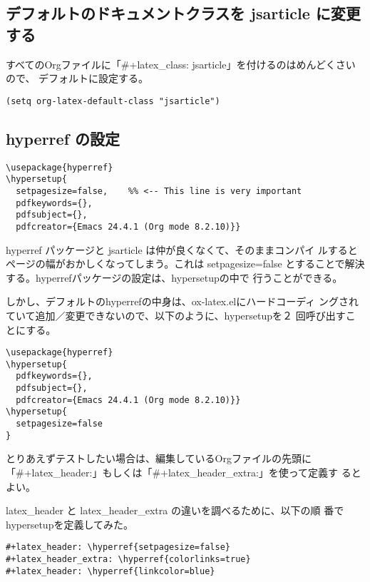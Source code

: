 \documentclass[dvipdfmx,12pt]{jsarticle}
\begin{document}
\subsection{デフォルトのドキュメントクラスを jsarticle に変更する}
\label{sec-4-6}

すべてのOrgファイルに「\#+latex\_class: jsarticle」を付けるのはめんどくさいので、
デフォルトに設定する。

\lstset{language=Lisp,label= ,caption= ,numbers=none}
\begin{lstlisting}
(setq org-latex-default-class "jsarticle")
\end{lstlisting}

\subsection{hyperref の設定}
\label{sec-4-7}

\lstset{language=[LaTeX]TeX,label= ,caption= ,numbers=none}
\begin{lstlisting}
\usepackage{hyperref}
\hypersetup{
  setpagesize=false,    %% <-- This line is very important
  pdfkeywords={},
  pdfsubject={},
  pdfcreator={Emacs 24.4.1 (Org mode 8.2.10)}}
\end{lstlisting}

hyperref パッケージと jsarticle は仲が良くなくて、そのままコンパイ
ルするとページの幅がおかしくなってしまう。これは setpagesize=false
とすることで解決する。hyperrefパッケージの設定は、hypersetupの中で
行うことができる。

しかし、デフォルトのhyperrefの中身は、ox-latex.elにハードコーディ
ングされていて追加／変更できないので、以下のように、hypersetupを２
回呼び出すことにする。

\lstset{language=[LaTeX]TeX,label= ,caption= ,numbers=none}
\begin{lstlisting}
\usepackage{hyperref}
\hypersetup{
  pdfkeywords={},
  pdfsubject={},
  pdfcreator={Emacs 24.4.1 (Org mode 8.2.10)}}
\hypersetup{
  setpagesize=false
}
\end{lstlisting}

とりあえずテストしたい場合は、編集しているOrgファイルの先頭に
「\#+latex\_header:」もしくは「\#+latex\_header\_extra:」を使って定義す
るとよい。

latex\_header と latex\_header\_extra の違いを調べるために、以下の順
番でhypersetupを定義してみた。

\lstset{language=[LaTeX]TeX,label= ,caption= ,numbers=none}
\begin{lstlisting}
#+latex_header: \hyperref{setpagesize=false}
#+latex_header_extra: \hyperref{colorlinks=true}
#+latex_header: \hyperref{linkcolor=blue}
\end{lstlisting}
\end{document}
